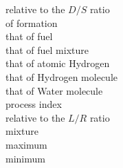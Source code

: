 \begin{tabbing}
                                   \> relative to the $D/S$ ratio                                                                                                              \\
                                      \> of formation                                                                                                                             \\
                 \> that of fuel                                                                                                                             \\
              \> that of fuel mixture                                                                                                                     \\
            \> that of atomic Hydrogen                                                                                                                  \\
           \> that of Hydrogen molecule                                                                                                                \\
          \> that of Water molecule                                                                                                                   \\
                                      \> process index                                                                                                                            \\
                                   \> relative to the $L/R$ ratio                                                                                                              \\
                                      \> mixture                                                                                                                                  \\
                                  \> maximum                                                                                                                                  \\
                                  \> minimum                                                                                                                                  \\

\end{tabbing}
